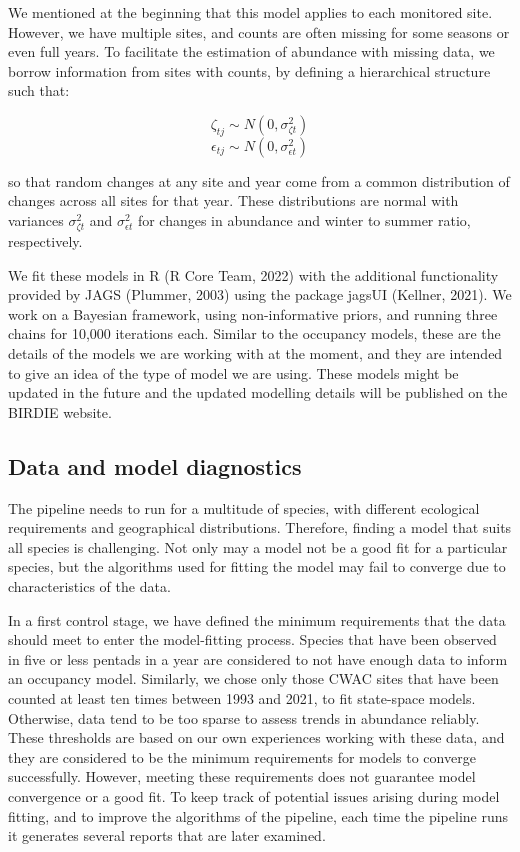 \documentclass[utf8]{frontiersSCNS}
\begin{document}
We mentioned at the beginning that this model applies to each monitored
site. However, we have multiple sites, and counts are often missing for
some seasons or even full years. To facilitate the estimation of
abundance with missing data, we borrow information from sites with
counts, by defining a hierarchical structure such that:

\[\zeta_{tj} \sim N(0, \sigma^2_{\zeta t})\]
\[\epsilon_{tj} \sim N(0, \sigma^2_{\epsilon t})\]

so that random changes at any site and year come from a common
distribution of changes across all sites for that year. These
distributions are normal with variances \(\sigma^2_{\zeta t}\) and
\(\sigma^2_{\epsilon t}\) for changes in abundance and winter to summer
ratio, respectively.

We fit these models in R (R Core Team, 2022) with the additional
functionality provided by JAGS (Plummer, 2003) using the package jagsUI
(Kellner, 2021). We work on a Bayesian framework, using non-informative
priors, and running three chains for 10,000 iterations each. Similar to
the occupancy models, these are the details of the models we are working
with at the moment, and they are intended to give an idea of the type of
model we are using. These models might be updated in the future and the
updated modelling details will be published on the BIRDIE website.

\hypertarget{data-and-model-diagnostics}{%
\subsection*{Data and model
diagnostics}\label{data-and-model-diagnostics}}

The pipeline needs to run for a multitude of species, with different
ecological requirements and geographical distributions. Therefore,
finding a model that suits all species is challenging. Not only may a
model not be a good fit for a particular species, but the algorithms
used for fitting the model may fail to converge due to characteristics
of the data.

In a first control stage, we have defined the minimum requirements that
the data should meet to enter the model-fitting process. Species that
have been observed in five or less pentads in a year are considered to
not have enough data to inform an occupancy model. Similarly, we chose
only those CWAC sites that have been counted at least ten times between
1993 and 2021, to fit state-space models. Otherwise, data tend to be too
sparse to assess trends in abundance reliably. These thresholds are
based on our own experiences working with these data, and they are
considered to be the minimum requirements for models to converge
successfully. However, meeting these requirements does not guarantee
model convergence or a good fit. To keep track of potential issues
arising during model fitting, and to improve the algorithms of the
pipeline, each time the pipeline runs it generates several reports that
are later examined.
\end{document}
